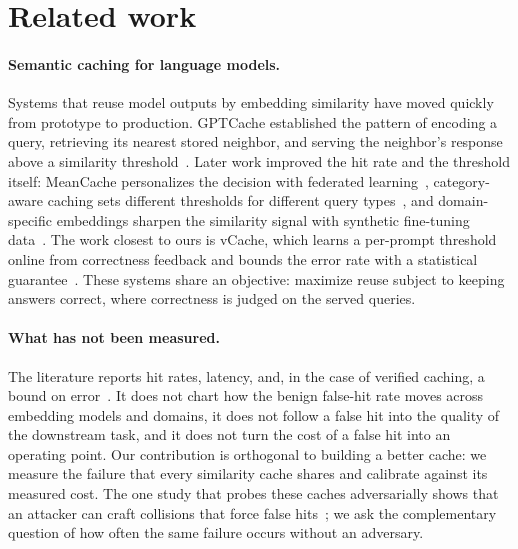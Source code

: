 \section{Related work}
\label{sec:related}

\paragraph{Semantic caching for language models.}
Systems that reuse model outputs by embedding similarity have moved quickly from prototype
to production. \mbox{GPTCache} established the pattern of encoding a query, retrieving its
nearest stored neighbor, and serving the neighbor's response above a similarity
threshold~\cite{bang2023gptcache}. Later work improved the hit rate and the threshold
itself: \mbox{MeanCache} personalizes the decision with federated
learning~\cite{gill2024meancache}, category-aware caching sets different thresholds for
different query types~\cite{wang2025categoryaware}, and domain-specific embeddings sharpen
the similarity signal with synthetic fine-tuning data~\cite{gill2025advancing}. The work
closest to ours is \mbox{vCache}, which learns a per-prompt threshold online from
correctness feedback and bounds the error rate with a statistical
guarantee~\cite{schroeder2025vcache}. These systems share an objective: maximize reuse
subject to keeping answers correct, where correctness is judged on the served queries.

\paragraph{What has not been measured.}
The literature reports hit rates, latency, and, in the case of verified caching, a bound on
error~\cite{schroeder2025vcache,gill2024meancache}. It does not chart how the benign
false-hit rate moves across embedding models and domains, it does not follow a false hit
into the quality of the downstream task, and it does not turn the cost of a false hit into
an operating point. Our contribution is orthogonal to building a better cache: we measure
the failure that every similarity cache shares and calibrate against its measured cost.
The one study that probes these caches adversarially shows that an attacker can craft
collisions that force false hits~\cite{zhang2026keycollision}; we ask the complementary
question of how often the same failure occurs without an adversary.

